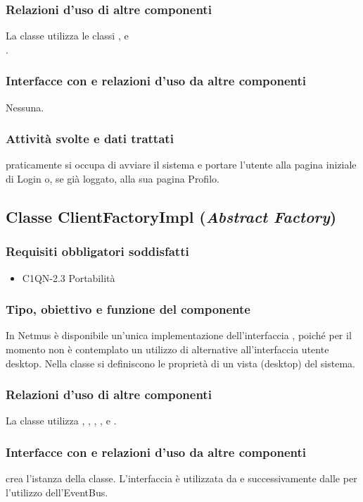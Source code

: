\subsubsection*{Relazioni d'uso di altre componenti}
La classe  utilizza le classi ,
 e \\.

\subsubsection*{Interfacce con e relazioni d'uso da altre componenti}
Nessuna.

\subsubsection*{Attivit\`a svolte e dati trattati}
 praticamente si occupa di avviare il sistema e portare l'utente alla
pagina iniziale di Login o, se gi\`a loggato, alla sua pagina Profilo.

\subsection{Classe ClientFactoryImpl (\emph{Abstract Factory})}
\subsubsection*{Requisiti obbligatori soddisfatti}
\begin{itemize}
	\item C1QN-2.3 Portabilit\`a
\end{itemize}
\subsubsection*{Tipo, obiettivo e funzione del componente}
In Netmus \`e disponibile un'unica implementazione dell'interfaccia
, poich\'e per il momento non \`e contemplato un utilizzo di
alternative all'interfaccia utente desktop.
Nella classe si definiscono le propriet\`a di un vista (desktop) del
sistema.

\subsubsection*{Relazioni d'uso di altre componenti}
La classe utilizza , , ,
,  e
.
\subsubsection*{Interfacce con e relazioni d'uso da altre componenti}
 crea l'istanza della classe. L'interfaccia  \`e
utilizzata da  e successivamente dalle  per
l'utilizzo dell'EventBus.
